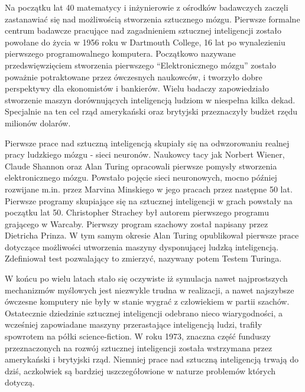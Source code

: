 \begin{par}
Na początku lat 40 matematycy i inżynierowie z ośrodków badawczych zaczęli zastanawiać się nad możliwością stworzenia sztucznego mózgu.
Pierwsze formalne centrum badawcze pracujące nad zagadnieniem sztucznej inteligencji zostało powołane do życia w 1956 roku w Dartmouth College, 16 lat po wynalezieniu pierwszego programowalnego komputera.
Początkowo nazywane przedswięwzięciem stworzenia pierwszego ``Elektronicznego mózgu'' zostało poważnie potraktowane przez ówczesnych naukowców, i tworzyło dobre perspektywy dla ekonomistów i bankierów.
Wielu badaczy zapowiedziało stworzenie maszyn dorównujących inteligencją ludziom w niespełna kilka dekad.
Specjalnie na ten cel rząd amerykański oraz brytyjski przeznaczyły budżet rzędu milionów dolarów.
\end{par}
\begin{par}
Pierwsze prace nad sztuczną inteligencją skupiały się na odwzorowaniu realnej pracy ludzkiego mózgu - sieci neuronów.
Naukowcy tacy jak Norbert Wiener, Claude Shannon oraz Alan Turing opracowali pierwsze pomysły stworzenia elektronicznego mózgu.
Powstało pojęcie sieci neuronowych, mocno później rozwijane m.in. przez Marvina Minskiego w jego pracach przez następne 50 lat.
Pierwsze programy skupiające się na sztucznej inteligencji w grach powstały na początku lat 50. Christopher Strachey był autorem pierwszego programu grającego w Warcaby.
Pierwszy program szachowy został napisany przez Dietricha Prinza.
W tym samym okresie Alan Turing opublikował pierwsze prace dotyczące możliwości utworzenia maszyny dysponującej ludzką inteligencją.
Zdefiniował test pozwalający to zmierzyć, nazywany potem Testem Turinga.
\end{par}
\begin{par}
W końcu po wielu latach stało się oczywiste iż symulacja nawet najprostszych mechanizmów myślowych jest niezwykle trudna w realizacji, a nawet najszybsze ówczesne komputery nie były w stanie wygrać z człowiekiem w partii szachów. 
Ostatecznie dziedzinie sztucznej inteligencji odebrano nieco wiarygodności, a wcześniej zapowiadane maszyny przerastające inteligencją ludzi, trafiły spowrotem na półki science-fiction. W roku 1973, znaczna część funduszy przeznaczonych na rozwój sztucznej inteligencji została wstrzymana przez amerykański i brytyjski rząd.
Niemniej prace nad sztuczną inteligencją trwają do dziś, aczkolwiek są bardziej uszczegółowione w naturze problemów których dotyczą.
\end{par}
